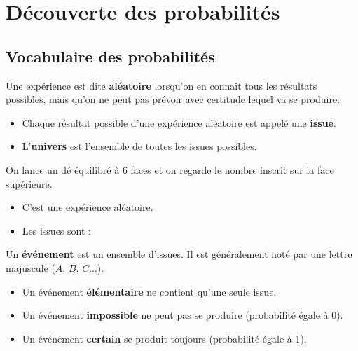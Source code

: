 \documentclass[a4paper]{book}
\begin{document}
\setcounter{chapter}{10}
\renewcommand{\monTitre}{Découverte des probabilités}
\chapter{\monTitre}
\thispagestyle{fancy} 

\section{Vocabulaire des probabilités}

    \begin{definition}
        Une expérience est dite \textbf{aléatoire} lorsqu'on en connaît tous les résultats possibles, mais qu'on ne peut pas prévoir avec certitude lequel va se produire.
    \end{definition}
    
    
    \begin{itemize}[label=$\bullet$]
        \item Chaque résultat possible d'une expérience aléatoire est appelé une \textbf{issue}.
        \item L'\textbf{univers} est l'ensemble de toutes les issues possibles.
    \end{itemize}
    
    
    \begin{exemple}
        On lance un dé équilibré à 6 faces et on regarde le nombre inscrit sur la face supérieure.
        \begin{itemize}
            \item C'est une expérience aléatoire.

            \medskip
            
            \item Les issues sont : \dotfill
        \end{itemize}
    \end{exemple}
    
    
    \begin{definition}[Événement]
        Un \textbf{événement} est un ensemble d'issues. Il est généralement noté par une lettre majuscule ($A$, $B$, $C$...).
        \begin{itemize}
            \item Un événement \textbf{élémentaire} ne contient qu'une seule issue.
            \item Un événement \textbf{impossible} ne peut pas se produire (probabilité égale à 0).
            \item Un événement \textbf{certain} se produit toujours (probabilité égale à 1).
        \end{itemize}
    \end{definition}
    
\end{document}
